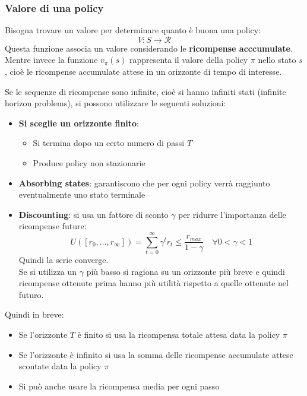 \documentclass[a4paper]{article}
\begin{document}
\subsubsection{Valore di una policy}
Bisogna trovare un valore per determinare quanto è buona una policy:
\[
  V : S \to \mathcal{R}
\] 
Questa funzione associa un valore considerando le \textbf{ricompense acccumulate}.
Mentre invece la funzione \( v_{\pi}(s) \) rappresenta il valore della policy \( \pi \)
nello stato \( s \), cioè le ricompense accumulate attese in un orizzonte di tempo
di interesse.

\vspace{1em}
\noindent
Se le sequenze di ricompense sono infinite, cioè si hanno infiniti stati (infinite
horizon problems), si possono utilizzare le seguenti soluzioni:
\begin{itemize}
  \item \textbf{Si sceglie un orizzonte finito}:
    \begin{itemize}
      \item Si termina dopo un certo numero di passi \( T \) 
      \item Produce policy non stazionarie
    \end{itemize}

  \item \textbf{Absorbing states}: garantiscono che per ogni policy verrà raggiunto
    eventualmente uno stato terminale
  \item \textbf{Discounting}: si usa un fattore di sconto \( \gamma \) per
    ridurre l'importanza delle ricompense future:
    \[
      U\left( [r_0, \ldots, r_{\infty}] \right) = \sum_{t=0}^{\infty} \gamma^t r_t
      \le \frac{r_{max}}{1 - \gamma} \quad \forall 0 < \gamma < 1
    \] 
    Quindi la serie converge.\\
    Se si utilizza un \( \gamma  \) più basso si ragiona su un orizzonte più breve e
    quindi ricompense ottenute prima hanno più utilità rispetto a quelle ottenute nel
    futuro.
\end{itemize}

\vspace{1em}
\noindent
Quindi in breve:
\begin{itemize}
  \item Se l'orizzonte \( T \) è finito si usa la ricompensa totale attesa data la policy
    \( \pi  \) 

  \item Se l'orizzonte è infinito si usa la somma delle ricompense accumulate attese 
    scontate data la policy \( \pi  \)

  \item Si può anche usare la ricompensa media per ogni passo
\end{itemize}
\end{document}
